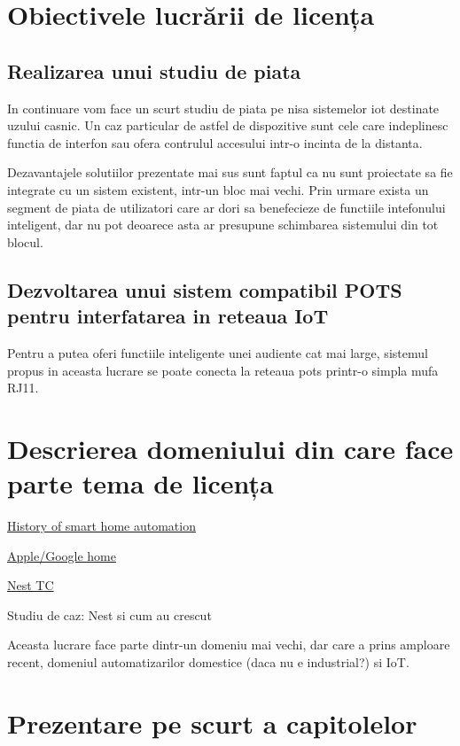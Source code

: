 \section {Obiectivele lucrării de licența}

\subsection {Realizarea unui studiu de piata}

In continuare vom face un scurt studiu de piata pe nisa sistemelor \acrfull{iot} destinate uzului casnic. Un caz particular de astfel de dispozitive sunt cele care indeplinesc functia de interfon sau ofera contrulul accesului intr-o incinta de la distanta.

Dezavantajele solutiilor prezentate mai sus sunt faptul ca nu sunt proiectate sa fie integrate cu un sistem existent, intr-un bloc mai vechi. Prin urmare exista un segment de piata de utilizatori care ar dori sa benefecieze de functiile intefonului inteligent, dar nu pot deoarece asta ar presupune schimbarea sistemului din tot blocul.

\subsection {Dezvoltarea unui sistem compatibil POTS pentru interfatarea in reteaua IoT}

Pentru a putea oferi functiile inteligente unei audiente cat mai large, sistemul propus in aceasta lucrare se poate conecta la reteaua \acrfull{pots} printr-o simpla mufa RJ11.

\section {Descrierea domeniului din care face parte tema de licența}

\href{https://zeusintegrated.com/blog/item/a-brief-history-of-smart-home-automation}{History of smart home automation}

\href{https://www.familyhandyman.com/article/the-history-of-smart-home-technology/}{Apple/Google home}

\href{https://techcrunch.com/2013/05/11/from-the-garage-to-200-employees-in-3-years-how-nest-thermostats-were-born/}{Nest TC}

Studiu de caz: Nest si cum au crescut


Aceasta lucrare face parte dintr-un domeniu mai vechi, dar care a prins amploare recent, domeniul automatizarilor domestice (daca nu e industrial?) si IoT. 

\section {Prezentare pe scurt a capitolelor}

